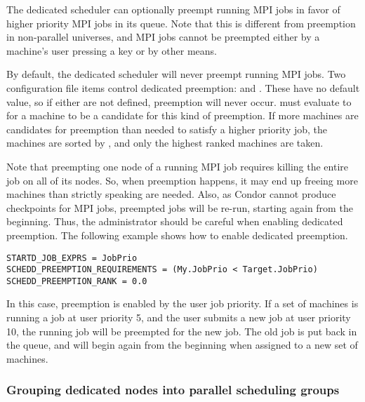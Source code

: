 The dedicated scheduler can optionally preempt running MPI jobs in
favor of higher priority MPI jobs in its queue.  Note that this is
different from preemption in non-parallel universes, and MPI jobs cannot
be preempted either by a machine's user pressing a key or by other means.

By default, the dedicated scheduler will never preempt running MPI jobs.
Two configuration file items control dedicated preemption: 
 and .
These have no default value, so if either are not defined, preemption will
never occur.  must evaluate to 
for a machine to be a candidate for this kind of preemption.
If more machines are 
candidates for preemption than needed to satisfy a higher priority job, the
machines are sorted by , and
only the highest ranked machines are taken.

Note that preempting one node of a running MPI job requires killing
the entire job on all of its nodes.  So, when preemption happens, it
may end up freeing more machines than strictly speaking are needed.
Also, as Condor cannot produce checkpoints for MPI jobs,
preempted jobs will be re-run, starting again from the beginning.
Thus, the administrator should be careful when
enabling dedicated preemption.  The following example shows how to
enable dedicated preemption.

\begin{verbatim}
STARTD_JOB_EXPRS = JobPrio
SCHEDD_PREEMPTION_REQUIREMENTS = (My.JobPrio < Target.JobPrio)
SCHEDD_PREEMPTION_RANK = 0.0
\end{verbatim}

In this case, preemption is enabled by the user job priority. If a set
of machines is running a job at user priority 5, and the user submits
a new job at user priority 10, the running job will be preempted for
the new job.  The old job is put back in the queue, and will begin again
from the beginning when assigned to a new set of machines.

\subsubsection{\label{sec:Configure-Dedicated-Groups}
Grouping dedicated nodes into parallel scheduling groups}


